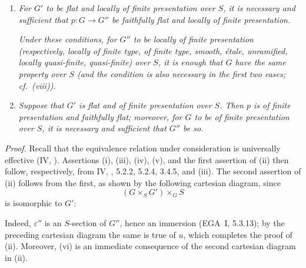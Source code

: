 \begin{enumerate}
  \emph{In this case, for \(G''\) to be flat over \(S\), it is
  necessary and sufficient that \(G\) be flat over \(S\).}

\item[\textup{(xii)}]\label{concl:sga3-VIB-9.2-xii}
  \emph{For \(G'\) to be flat and locally of finite presentation
  over \(S\), it is necessary and sufficient that \(p:G\to G''\)
  be faithfully flat and locally of finite presentation.}

  \emph{Under these conditions, for \(G''\) to be locally of finite
  presentation \textup{(respectively, locally of finite type, of
  finite type, smooth, \'etale, unramified, locally quasi-finite,
  quasi-finite)} over \(S\), it is enough that \(G\) have the same
  property over \(S\) \textup{(and the condition is also necessary
  in the first two cases; cf.\ \textup{(viii)})}.}

\item[\textup{(xiii)}]\label{concl:sga3-VIB-9.2-xiii}
  \emph{Suppose that \(G'\) is flat and of finite presentation
  over \(S\). Then \(p\) is of finite presentation and faithfully
  flat; moreover, for \(G\) to be of finite presentation over
  \(S\), it is necessary and sufficient that \(G''\) be so.}
\end{enumerate}

\emph{Proof.}
Recall that the equivalence relation under consideration is
universally effective (IV, ). Assertions
\textup{(i)}, \textup{(iii)}, \textup{(iv)}, \textup{(v)}, and the
first assertion of \textup{(ii)} then follow, respectively, from
IV, , 5.2.2, 5.2.4, 3.4.5, and \textup{(iii)}. The second
assertion of \textup{(ii)} follows from the first, as shown by the
following cartesian diagram, since
\[
  (G\times_SG')\times_GS
\]
is isomorphic to \(G'\):
\begin{center}
  \label{diag:sga3-VIB-9.2-proof-cartesian}%
  {\small
  }
\end{center}
Indeed, \(\varepsilon''\) is an \(S\)-section of \(G''\), hence an
immersion (EGA~I, 5.3.13); by the preceding cartesian diagram the same
is true of \(u\), which completes the proof of \textup{(ii)}.
Moreover, \textup{(vi)} is an immediate consequence of the second
cartesian diagram in \textup{(ii)}.

